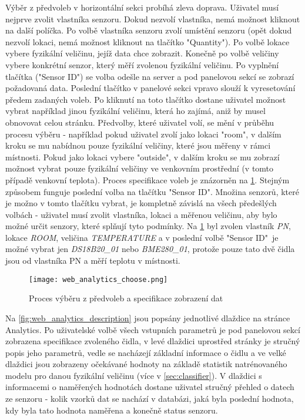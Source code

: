Výběr z předvoleb v horizontální sekci probíhá zleva doprava. Uživatel musí nejprve zvolit vlastníka senzoru. Dokud nezvolí vlastníka, nemá možnost kliknout na další políčka. Po volbě vlastníka senzoru zvolí umístění senzoru (opět dokud nezvolí lokaci, nemá možnost kliknout na tlačítko "Quantity"). Po volbě lokace vybere fyzikální veličinu, jejíž data chce zobrazit. Konečně po volbě veličiny vybere konkrétní senzor, který měří zvolenou fyzikální veličinu. Po vyplnění tlačítka ("Sensor ID") se volba odešle na server a pod panelovou sekcí se zobrazí požadovaná data. Poslední tlačítko v panelové sekci vpravo slouží k vyresetování předem zadaných voleb. Po kliknutí na toto tlačítko dostane uživatel možnost vybrat například jinou fyzikální veličinu, která ho zajímá, aniž by musel obnovovat celou stránku. Předvolby, které uživatel volí, se mění v průběhu procesu výběru - například pokud uživatel zvolí jako lokaci "room", v dalším kroku se mu nabídnou pouze fyzikální veličiny, které jsou měřeny v rámci místnosti. Pokud jako lokaci vybere "outside", v dalším kroku se mu zobrazí možnost vybrat pouze fyzikální veličiny ve venkovním prostřední (v tomto případě venkovní teplota). Proces specifikace voleb je znázorněn na \cref{fig:web_analytics_choose}. Stejným způsobem funguje poslední volba na tlačítku "Sensor ID". Množina senzorů, které je možno v tomto tlačítku vybrat, je kompletně závislá na všech předešlých volbách - uživatel musí zvolit vlastníka, lokaci a měřenou veličinu, aby bylo možné určit senzory, které splňují tyto podmínky. Na \cref{fig:web_analytics_choose} byl zvolen vlastník \textit{PN}, lokace \textit{ROOM}, veličina \textit{TEMPERATURE} a v poslední volbě "Sensor ID"\ je možné vybrat jen \textit{DS18B20\_01} nebo \textit{BME280\_01}, protože pouze tato dvě čidla jsou od vlastníka PN a měří teplotu v místnosti.

\begin{figure}[H]
  \centering
  \texttt{[image: web\_analytics\_choose.png]}
  \caption{Proces výběru z předvoleb a specifikace zobrazení dat}
  \label{fig:web_analytics_choose}
\end{figure}

Na \cref{fig:web_analytics_description} jsou popsány jednotlivé dlaždice na stránce Analytics. Po uživatelské volbě všech vstupních parametrů je pod panelovou sekcí zobrazena specifikace zvoleného čidla, v levé dlaždici uprostřed stránky je stručný popis jeho parametrů, vedle se nacházejí základní informace o čidlu a ve velké dlaždici jsou zobrazeny očekávané hodnoty na základě statistik natrénovaného modelu pro danou fyzikální veličinu (více v \cref{sec:classifier}). V dlaždici s informacemi o naměřených hodnotách dostane uživatel stručný přehled o datech ze senzoru - kolik vzorků dat se nachází v databázi, jaká byla poslední hodnota, kdy byla tato hodnota naměřena a konečně status senzoru.

